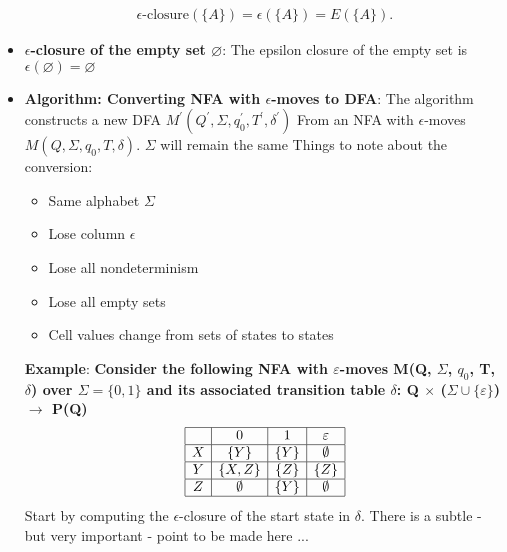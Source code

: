 \documentclass{report}
\begin{document}
\begin{itemize}
\begin{align*}
                \epsilon\text{-closure}(\{A\}) = \epsilon(\{A\}) = E(\{A\})
            .\end{align*}
        \item \textbf{$\epsilon$-closure of the empty set $\varnothing$}: The epsilon closure of the empty set is $\epsilon(\varnothing)  = \varnothing$
        \item \textbf{Algorithm: Converting NFA with $\epsilon$-moves to DFA}: The algorithm constructs a new DFA $M^{\prime}(Q^{\prime}, \Sigma, q_{0}^{\prime}, T^{\prime}, \delta^{\prime}) $ From an NFA with $\epsilon$-moves $M(Q, \Sigma, q_{0}, T, \delta) $. $\Sigma$ will remain the same
            \bigbreak \noindent 
            Things to note about the conversion:
            \begin{itemize}
                \item Same alphabet $\Sigma $
                \item Lose column $\epsilon$
                \item Lose all nondeterminism
                \item Lose all empty sets
                \item Cell values change from sets of states to states
            \end{itemize}
            \bigbreak \noindent 
            \textbf{Example}:
            \textbf{Consider the following NFA with $\varepsilon$-moves M(Q, $\Sigma$, $q_0$, T, $\delta$) over $\Sigma = \{0, 1\}$ and its associated transition table $\delta$: Q $\times$ ($\Sigma \cup \{\varepsilon\}$) $\rightarrow$ P(Q)}
            \bigbreak \noindent 
            \[
                \begin{array}{|c|c|c|c|}
                    \hline
                     & 0 & 1 & \varepsilon \\
                    \hline
                    X & \{Y\} & \{Y\} & \emptyset \\
                    \hline
                    Y & \{X, Z\} & \{Z\} & \{Z\} \\
                    \hline
                    Z & \emptyset & \{Y\} & \emptyset \\
                    \hline
                \end{array}
            \]
            \bigbreak \noindent 
            Start by computing the $\epsilon$-closure of the start state in $\delta$.
            \bigbreak \noindent 
            \bigbreak \noindent 
            There is a subtle - but very important - point to be made here ...

\end{itemize}
\end{document}
